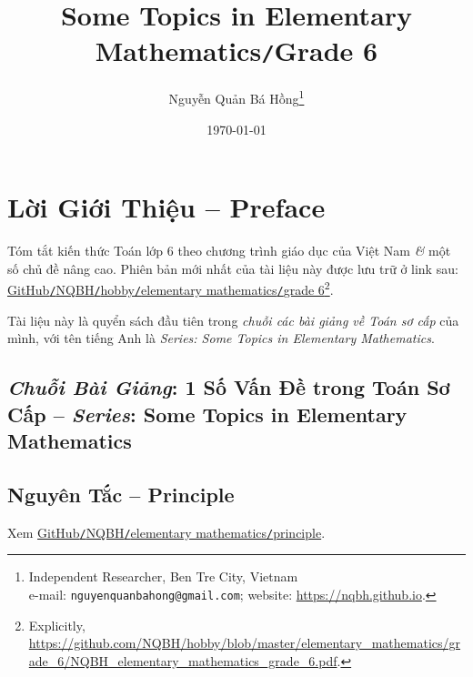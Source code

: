 \documentclass[oneside]{book}
\title{Some Topics in Elementary Mathematics\texttt{/}Grade 6}
\author{Nguyễn Quản Bá Hồng\footnote{Independent Researcher, Ben Tre City, Vietnam\\e-mail: \texttt{nguyenquanbahong@gmail.com}; website: \url{https://nqbh.github.io}.}}
\date{\today}
\numberwithin{equation}{section}
\begin{document}
\maketitle
\setcounter{secnumdepth}{4}
\setcounter{tocdepth}{3}
\tableofcontents
\newpage


\chapter*{Lời Giới Thiệu -- Preface}

Tóm tắt kiến thức Toán lớp 6 theo chương trình giáo dục của Việt Nam \textit{\&} một số chủ đề nâng cao. Phiên bản mới nhất của tài liệu này được lưu trữ ở link sau: \href{https://github.com/NQBH/hobby/blob/master/elementary_mathematics/grade_6/NQBH_elementary_mathematics_grade_6.pdf}{GitHub\texttt{/}NQBH\texttt{/}hobby\texttt{/}elementary mathematics\texttt{/}grade 6}\footnote{Explicitly, \url{https://github.com/NQBH/hobby/blob/master/elementary_mathematics/grade_6/NQBH_elementary_mathematics_grade_6.pdf}.}.

Tài liệu này là quyển sách đầu tiên trong \textit{chuỗi các bài giảng về Toán sơ cấp} của mình, với tên tiếng Anh là \textit{Series: Some Topics in Elementary Mathematics}.

\section*{\textit{Chuỗi Bài Giảng}: 1 Số Vấn Đề trong Toán Sơ Cấp -- \textit{Series}: Some Topics in Elementary Mathematics}


\section*{Nguyên Tắc -- Principle}
Xem \href{https://github.com/NQBH/hobby/blob/master/elementary_mathematics/principle/NQBH_elementary_mathematics_principle.pdf}{GitHub\texttt{/}NQBH\texttt{/}elementary mathematics\texttt{/}principle}.
\end{document}
